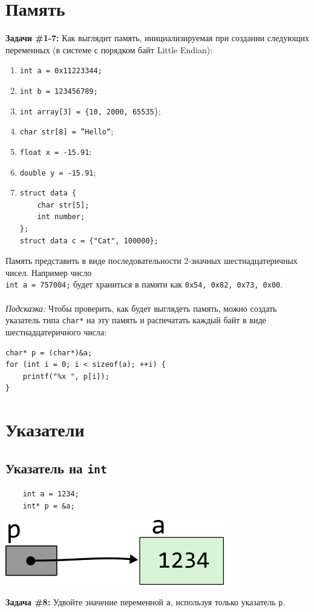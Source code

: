 \documentclass{article}
\begin{document}
\section*{Память}
\textbf{Задачи \#1-7:} Как выглядит память, инициализируемая при создании следующих переменных (в системе с порядком байт Little Endian):
\begin{multicols}{2}
\begin{enumerate}
\item \texttt{int a = 0x11223344;}
\item \texttt{int b = 123456789;}
\item \texttt{int array[3] = \{10, 2000, 65535}\};
\item \texttt{char str[8] = ''Hello``};
\item \texttt{float x = -15.91};
\item \texttt{double y = -15.91};
\item
\begin{verbatim}
struct data {
    char str[5];
    int number;
};
struct data c = {"Cat", 100000};
\end{verbatim}
\end{enumerate}
\end{multicols}
Память представить в виде последовательности 2-значных шестнадцатеричных чисел. Например число \\
\texttt{int a = 757004;} будет храниться в памяти как \texttt{0x54, 0x82, 0x73, 0x00}. \\ \\
\textit{Подсказка:} Чтобы проверить, как будет выглядеть память, можно создать указатель типа \texttt{char*} на эту память и распечатать каждый байт в виде шестнадцатеричного числа:
\begin{lstlisting}
char* p = (char*)&a;
for (int i = 0; i < sizeof(a); ++i) {
    printf("%x ", p[i]);
}
\end{lstlisting}

\section*{Указатели}

\subsection*{Указатель на \texttt{int}}
\begin{multicols}{2}
\begin{lstlisting}
	int a = 1234;
	int* p = &a;
\end{lstlisting}
\columnbreak
\begin{center}
\includegraphics[scale=1]{../images/pointer_schemes/pointer_to_int.png}
\end{center}
\end{multicols}
\textbf{Задача \#8:} Удвойте значение переменной \texttt{a}, используя только указатель \texttt{p}.
\end{document}

